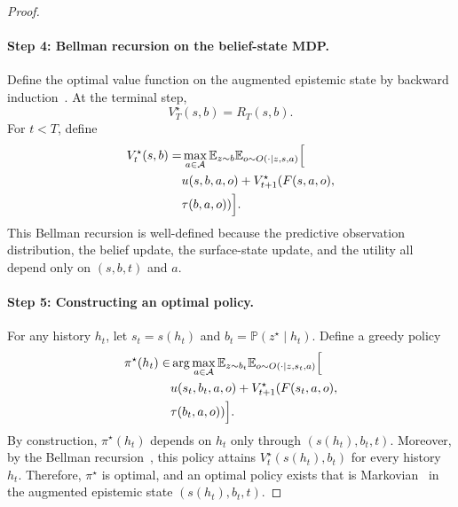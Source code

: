\documentclass[11pt]{article}
\theoremstyle{plain}
\theoremstyle{definition}
\theoremstyle{remark}
\begin{document}
\begin{proof}
\paragraph{Step 4: Bellman recursion on the belief-state MDP.}
Define the optimal value function on the augmented epistemic state by backward induction~\citep{sutton2018reinforcement}. At the terminal step,
\[
    V_T^\star(s,b)=R_T(s,b).
\]
For \(t<T\), define
\begin{align}
    V_t^\star(s,b)
    =&\notag
    \max_{a\in\mathcal{A}}
    \mathbb{E}_{z\sim b}
    \mathbb{E}_{o\sim O(\cdot\mid z,s,a)}
    \Big[\\
        &\notag u(s,b,a,o)
        +
        V_{t+1}^\star(F(s,a,o),\\
        &\tau(b,a,o))
    \Big].
\end{align}
This Bellman recursion is well-defined because the predictive observation distribution, the belief update, the surface-state update, and the utility all depend only on \((s,b,t)\) and \(a\).

\paragraph{Step 5: Constructing an optimal policy.}
For any history \(h_t\), let \(s_t=s(h_t)\) and \(b_t=\mathbb{P}(z^\star\mid h_t)\). Define a greedy policy
\begin{align}
    \pi^\star(h_t)
    \in&\notag
    \arg\max_{a\in\mathcal{A}}
    \mathbb{E}_{z\sim b_t}
    \mathbb{E}_{o\sim O(\cdot\mid z,s_t,a)}
    \Big[\\
        &\notag u(s_t,b_t,a,o)
        +
        V_{t+1}^\star(F(s_t,a,o),\\
        &\tau(b_t,a,o))
    \Big].
\end{align}
By construction, \(\pi^\star(h_t)\) depends on \(h_t\) only through \((s(h_t),b_t,t)\). Moreover, by the Bellman recursion~\citep{sutton2018reinforcement}, this policy attains \(V_t^\star(s(h_t),b_t)\) for every history \(h_t\). Therefore, \(\pi^\star\) is optimal, and an optimal policy exists that is Markovian~\citep{zhang2025markovianreflectiveexplorationbayesadaptive} in the augmented epistemic state \((s(h_t),b_t,t)\).
\end{proof}
\end{document}
